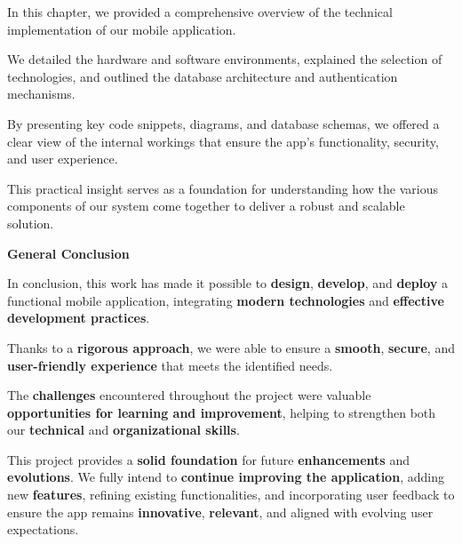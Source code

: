 \documentclass[12pt]{report}
\begin{document}
\noindent In this chapter, we provided a comprehensive overview of the technical implementation of our mobile application. 

\vspace{0.3cm}

\noindent We detailed the hardware and software environments, explained the selection of technologies, and outlined the database architecture and authentication mechanisms. 

\vspace{0.3cm}

\noindent By presenting key code snippets, diagrams, and database schemas, we offered a clear view of the internal workings that ensure the app’s functionality, security, and user experience. 

\vspace{0.3cm}

\noindent This practical insight serves as a foundation for understanding how the various components of our system come together to deliver a robust and scalable solution.


\newpage
\begin{center}
	\Huge \textbf{General Conclusion} \\
	\vspace*{0.3cm}
\end{center}

\noindent In conclusion, this work has made it possible to \textbf{design}, \textbf{develop}, and \textbf{deploy} a functional mobile application, integrating \textbf{modern technologies} and \textbf{effective development practices}.

\vspace{0.3cm}

\noindent Thanks to a \textbf{rigorous approach}, we were able to ensure a \textbf{smooth}, \textbf{secure}, and \textbf{user-friendly experience} that meets the identified needs.

\vspace{0.3cm}

\noindent The \textbf{challenges} encountered throughout the project were valuable \textbf{opportunities for learning and improvement}, helping to strengthen both our \textbf{technical} and \textbf{organizational skills}.

\vspace{0.3cm}

\noindent This project provides a \textbf{solid foundation} for future \textbf{enhancements} and \textbf{evolutions}. We fully intend to \textbf{continue improving the application}, adding new \textbf{features}, refining existing functionalities, and incorporating user feedback to ensure the app remains \textbf{innovative}, \textbf{relevant}, and aligned with evolving user expectations.
\end{document}
